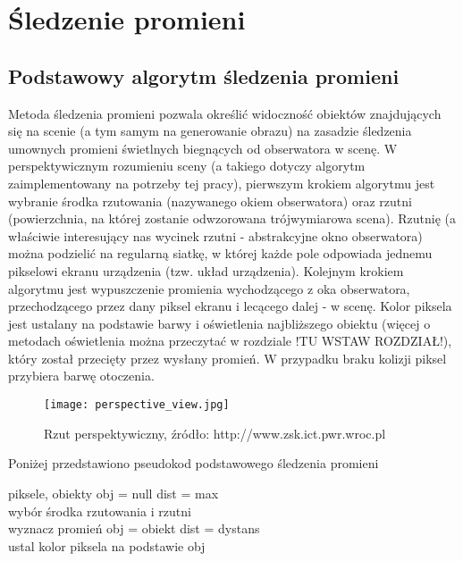 \section{Śledzenie promieni}

\subsection{Podstawowy algorytm śledzenia promieni}

Metoda śledzenia promieni pozwala określić widoczność obiektów znajdujących
się na scenie (a tym samym na generowanie obrazu) na zasadzie śledzenia umownych promieni świetlnych biegnących od obserwatora w scenę. W perspektywicznym rozumieniu sceny (a takiego dotyczy algorytm zaimplementowany na potrzeby tej pracy), pierwszym krokiem algorytmu jest wybranie środka rzutowania (nazywanego okiem obserwatora) oraz rzutni (powierzchnia, na której zostanie odwzorowana trójwymiarowa scena). Rzutnię (a właściwie interesujący nas wycinek rzutni - abstrakcyjne okno obserwatora) można podzielić na regularną siatkę, w której każde pole odpowiada jednemu pikselowi ekranu urządzenia (tzw. układ urządzenia). Kolejnym krokiem algorytmu jest wypuszczenie promienia wychodzącego z oka obserwatora, przechodzącego przez dany piksel ekranu i lecącego dalej - w scenę. Kolor piksela jest ustalany na podstawie barwy i oświetlenia najbliższego obiektu (więcej o metodach oświetlenia można przeczytać w rozdziale !TU WSTAW ROZDZIAŁ!), który został przecięty przez wysłany promień. W przypadku braku kolizji piksel przybiera barwę otoczenia. 

\begin{figure}[H]
\centering
  \caption{Rzut perspektywiczny, źródło: http://www.zsk.ict.pwr.wroc.pl}
  \texttt{[image: perspective\_view.jpg]}
\end{figure}

\noindent
Poniżej przedstawiono pseudokod podstawowego śledzenia promieni

\begin{algorithm}
\begin{algorithmic}
\State piksele, obiekty
\State obj = null
\State dist = max
\\
\State wybór środka rzutowania i rzutni
\\
	 \State wyznacz promień
    		\State obj = obiekt
    		\State dist = dystans
     \EndIf
	 \EndFor
\EndFor
\\
\State ustal kolor piksela na podstawie obj
\end{algorithmic}
\end{algorithm}

